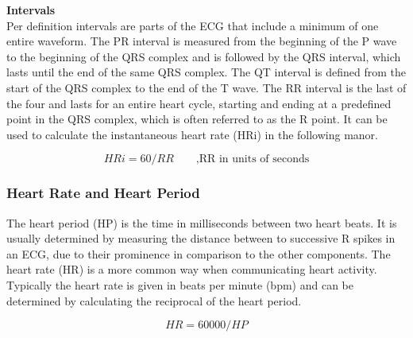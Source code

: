 \textbf{Intervals}\\
 Per definition intervals are parts of the ECG that include a minimum of one entire waveform. The PR interval is measured from the beginning of the P wave to the beginning of the QRS complex and is followed by the QRS interval, which lasts until the end of the same QRS complex. The QT interval is defined from the start of the QRS complex to the end of the T wave. The RR interval is the last of the four and lasts for an entire heart cycle, starting and ending at a predefined point in the QRS complex, which is often referred to as the R point. It can be used to calculate the instantaneous heart rate (HRi) in the following manor.

\begin{equation}
HRi = 60 / RR \qquad \text{,RR in units of seconds}	
\end{equation}

\subsubsection{Heart Rate and Heart Period}
The heart period (HP) is the time in milliseconds between two heart beats. It is usually determined by measuring the distance between to successive R spikes in an ECG, due to their prominence in comparison to the other components. The heart rate (HR) is a more common way when communicating heart activity. Typically the heart rate is given in beats per minute (bpm) and can be determined by calculating the reciprocal of the heart period.

\begin{equation}
HR = 60000 / HP
\end{equation}

